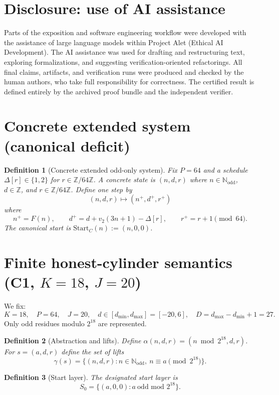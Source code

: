 \documentclass[11pt]{article}
\newtheorem{definition}{Definition}
\begin{document}
\section*{Disclosure: use of AI assistance}
Parts of the exposition and software engineering workflow were developed with the assistance of large language models
within Project Alet (Ethical AI Development). The AI assistance was used for drafting and restructuring text, exploring
formalizations, and suggesting verification-oriented refactorings. All final claims, artifacts, and verification runs
were produced and checked by the human authors, who take full responsibility for correctness. The certified result is
defined entirely by the archived proof bundle and the independent verifier.

\section{Concrete extended system (canonical deficit)}

\begin{definition}[Concrete extended odd-only system]
Fix $P=64$ and a schedule $\Delta[r]\in\{1,2\}$ for $r\in\mathbb{Z}/64\mathbb{Z}$.
A concrete state is $(n,d,r)$ where $n\in\mathbb{N}_{\mathrm{odd}}$, $d\in\mathbb{Z}$, and $r\in\mathbb{Z}/64\mathbb{Z}$.
Define one step by
\[
(n,d,r)\mapsto (n^+,d^+,r^+)
\]
where
\[
n^+ = F(n),\qquad d^+ = d + v_2(3n+1) - \Delta[r],\qquad r^+ = r+1 \pmod{64}.
\]
The canonical start is $\mathrm{Start}_C(n):=(n,0,0)$.
\end{definition}

\section{Finite honest-cylinder semantics (C1, $K=18$, $J=20$)}

We fix:
\[
K=18,\quad P=64,\quad J=20,\quad d\in[d_{\min},d_{\max}]=[-20,6],\quad D=d_{\max}-d_{\min}+1=27.
\]
Only odd residues modulo $2^{18}$ are represented.

\begin{definition}[Abstraction and lifts]
Define $\alpha(n,d,r)=(n\bmod 2^{18},d,r)$.
For $s=(a,d,r)$ define the set of lifts
\[
\gamma(s)=\{(n,d,r): n\in\mathbb{N}_{\mathrm{odd}},\ n\equiv a\pmod{2^{18}}\}.
\]
\end{definition}

\begin{definition}[Start layer]
The designated start layer is
\[
S_0=\{(a,0,0): a\ \text{odd mod }2^{18}\}.
\]
\end{definition}
\end{document}
